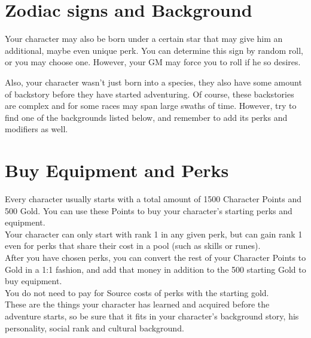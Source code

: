 \section{Zodiac signs and Background}\label{sec:charCreationBackgrounds}

Your character may also be born under a certain star that may give him an additional, maybe even unique perk.
You can determine this sign by random roll, or you may choose one.
However, your GM may force you to roll if he so desires.

Also, your character wasn't just born into a species, they also have some amount of backstory before they have started adventuring.
Of course, these backstories are complex and for some races may span large swaths of time.
However, try to find one of the backgrounds listed below, and remember to add its perks and modifiers as well.


\section{Buy Equipment and Perks}\label{sec:charCreationPerkAndEquip}

Every character usually starts with a total amount of 1500 Character Points and 500 Gold.
You can use these Points to buy your character's starting perks and equipment.\\
Your character can only start with rank 1 in any given perk, but can gain rank 1 even for perks that share their cost in a pool (such as skills or runes).\\
After you have chosen perks, you can convert the rest of your Character Points to Gold in a 1:1 fashion, and add that money in addition to the 500 starting Gold to buy equipment.\\
You do not need to pay for Source costs of perks with the starting gold.\\
These are the things your character has learned and acquired before the adventure starts, so be sure that it fits in your character's background story, his personality, social rank and cultural background.\\